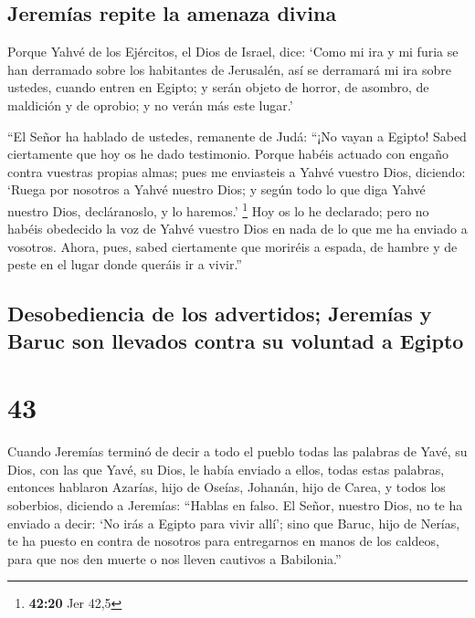 \hypertarget{jeremuxedas-repite-la-amenaza-divina}{%
\subsection{Jeremías repite la amenaza
divina}\label{jeremuxedas-repite-la-amenaza-divina}}

 Porque Yahvé de los Ejércitos, el Dios de Israel, dice:
`Como mi ira y mi furia se han derramado sobre los habitantes de
Jerusalén, así se derramará mi ira sobre ustedes, cuando entren en
Egipto; y serán objeto de horror, de asombro, de maldición y de oprobio;
y no verán más este lugar.'

 ``El Señor ha hablado de ustedes, remanente de Judá:
``¡No vayan a Egipto! Sabed ciertamente que hoy os he dado testimonio.
 Porque habéis actuado con engaño contra vuestras propias
almas; pues me enviasteis a Yahvé vuestro Dios, diciendo: `Ruega por
nosotros a Yahvé nuestro Dios; y según todo lo que diga Yahvé nuestro
Dios, decláranoslo, y lo haremos.' \footnote{\textbf{42:20} Jer 42,5}
 Hoy os lo he declarado; pero no habéis obedecido la voz
de Yahvé vuestro Dios en nada de lo que me ha enviado a vosotros.
 Ahora, pues, sabed ciertamente que moriréis a espada, de
hambre y de peste en el lugar donde queráis ir a vivir.''

\hypertarget{desobediencia-de-los-advertidos-jeremuxedas-y-baruc-son-llevados-contra-su-voluntad-a-egipto}{%
\subsection{Desobediencia de los advertidos; Jeremías y Baruc son
llevados contra su voluntad a
Egipto}\label{desobediencia-de-los-advertidos-jeremuxedas-y-baruc-son-llevados-contra-su-voluntad-a-egipto}}

\hypertarget{section-42}{%
\section{43}\label{section-42}}

 Cuando Jeremías terminó de decir a todo el pueblo todas
las palabras de Yavé, su Dios, con las que Yavé, su Dios, le había
enviado a ellos, todas estas palabras,  entonces hablaron
Azarías, hijo de Oseías, Johanán, hijo de Carea, y todos los soberbios,
diciendo a Jeremías: ``Hablas en falso. El Señor, nuestro Dios, no te ha
enviado a decir: `No irás a Egipto para vivir allí';  sino
que Baruc, hijo de Nerías, te ha puesto en contra de nosotros para
entregarnos en manos de los caldeos, para que nos den muerte o nos
lleven cautivos a Babilonia.''

